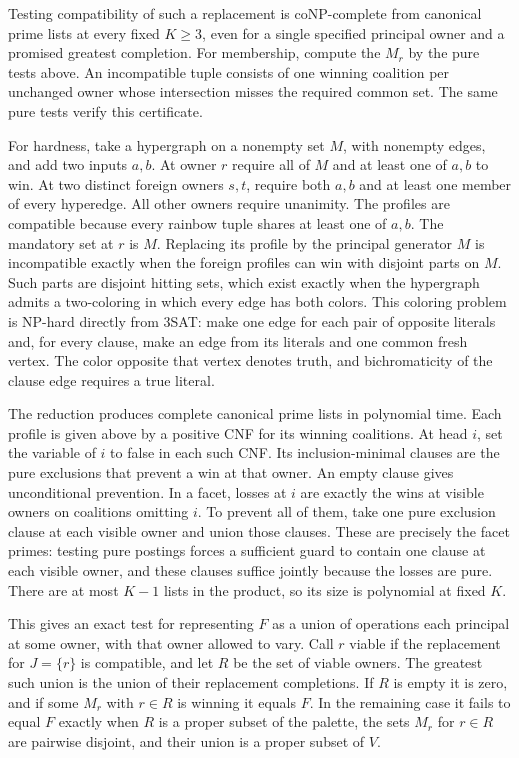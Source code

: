 Testing compatibility of such a replacement is coNP-complete
from canonical prime lists at every fixed $K\ge3$, even for a
single specified principal owner and a promised greatest
completion. For membership, compute the $M_r$ by the pure
tests above. An incompatible tuple consists of one winning
coalition per unchanged owner whose intersection misses the
required common set. The same pure tests verify this certificate.

For hardness, take a hypergraph on a nonempty set $M$, with
nonempty edges, and add two inputs $a,b$. At owner $r$ require
all of $M$ and at least one of $a,b$ to win. At two distinct
foreign owners $s,t$, require both $a,b$ and at least one member
of every hyperedge. All other owners require unanimity.
The profiles are compatible because every rainbow tuple shares
at least one of $a,b$. The mandatory set at $r$ is $M$.
Replacing its profile by the principal generator $M$ is
incompatible exactly when the foreign profiles can win with
disjoint parts on $M$. Such parts are disjoint hitting sets,
which exist exactly when the hypergraph admits a two-coloring
in which every edge has both colors. This coloring problem
is NP-hard directly from 3SAT: make one edge for each pair of
opposite literals and, for every clause, make an edge from its
literals and one common fresh vertex. The color opposite that
vertex denotes truth, and bichromaticity of the clause edge
requires a true literal.

The reduction produces complete canonical prime lists in
polynomial time. Each profile is given above by a positive CNF
for its winning coalitions. At head $i$, set the variable of $i$
to false in each such CNF. Its inclusion-minimal clauses are
the pure exclusions that prevent a win at that owner. An empty
clause gives unconditional prevention. In a facet, losses at
$i$ are exactly the wins at visible owners on coalitions
omitting $i$. To prevent all of them, take one pure exclusion
clause at each visible owner and union those clauses.
These are precisely the facet primes: testing pure postings
forces a sufficient guard to contain one clause at each
visible owner, and these clauses suffice jointly because
the losses are pure. There are at most $K-1$ lists in the
product, so its size is polynomial at fixed $K$.

This gives an exact test for representing $F$ as a union of
operations each principal at some owner, with that owner
allowed to vary. Call $r$ viable if the replacement for
$J=\{r\}$ is compatible, and let $R$ be the set of viable
owners. The greatest such union is the union of their
replacement completions. If $R$ is empty it is zero, and if
some $M_r$ with $r\in R$ is winning it equals $F$.
In the remaining case it fails to equal $F$ exactly when
$R$ is a proper subset of the palette, the sets $M_r$ for
$r\in R$ are pairwise disjoint, and their union is a proper
subset of $V$.

